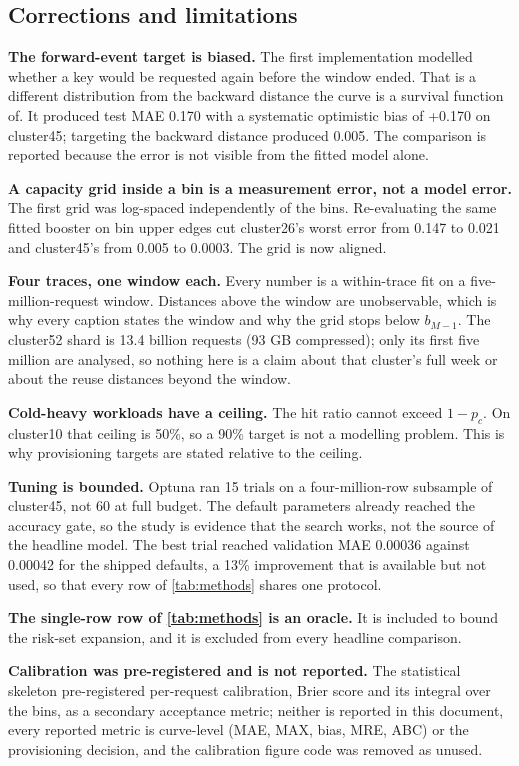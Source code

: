 \subsection{Corrections and limitations}
\label{app:limitations}

\textbf{The forward-event target is biased.} The first implementation modelled
whether a key would be requested again before the window ended. That is a different
distribution from the backward distance the curve is a survival function of. It
produced test MAE 0.170 with a systematic optimistic bias of +0.170 on cluster45;
targeting the backward distance produced 0.005. The comparison is reported because
the error is not visible from the fitted model alone.

\textbf{A capacity grid inside a bin is a measurement error, not a model error.} The
first grid was log-spaced independently of the bins. Re-evaluating the same fitted
booster on bin upper edges cut cluster26's worst error from 0.147 to 0.021 and
cluster45's from 0.005 to 0.0003. The grid is now aligned.

\textbf{Four traces, one window each.} Every number is a within-trace fit on a
five-million-request window. Distances above the window are unobservable, which is
why every caption states the window and why the grid stops below $b_{M-1}$. The
cluster52 shard is 13.4 billion requests (93 GB compressed); only its first five
million are analysed, so nothing here is a claim about that cluster's full week or
about the reuse distances beyond the window.

\textbf{Cold-heavy workloads have a ceiling.} The hit ratio cannot exceed $1-p_c$.
On cluster10 that ceiling is 50\%, so a 90\% target is not a modelling problem. This
is why provisioning targets are stated relative to the ceiling.

\textbf{Tuning is bounded.} Optuna ran 15 trials on a four-million-row subsample of
cluster45, not 60 at full budget. The default parameters already reached the accuracy
gate, so the study is evidence that the search works, not the source of the headline
model. The best trial reached validation MAE 0.00036 against 0.00042 for the shipped
defaults, a 13\% improvement that is available but not used, so that every row of
\cref{tab:methods} shares one protocol.

\textbf{The single-row row of \cref{tab:methods} is an oracle.} It is included to
bound the risk-set expansion, and it is excluded from every headline comparison.

\textbf{Calibration was pre-registered and is not reported.} The statistical skeleton
pre-registered per-request calibration, Brier score and its integral over the bins, as
a secondary acceptance metric; neither is reported in this document, every reported
metric is curve-level (MAE, MAX, bias, MRE, ABC) or the provisioning decision, and the
calibration figure code was removed as unused.

